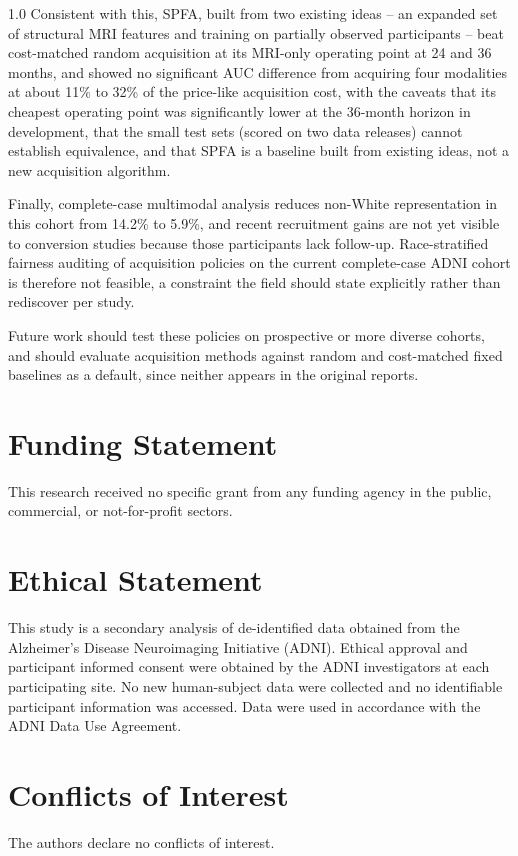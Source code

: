 \documentclass[12pt,twoside]{article}
\begin{document}
\begin{spacing}{1.0}
Consistent with this, SPFA, built from two existing ideas -- an expanded set
of structural MRI features and training on partially observed participants --
beat cost-matched random acquisition at its MRI-only operating point at 24 and
36 months, and showed no significant AUC difference from acquiring four
modalities at about 11\% to 32\% of the price-like acquisition cost, with the
caveats that its cheapest operating point was significantly lower at the
36-month horizon in development, that the small test sets (scored on two data
releases) cannot establish equivalence, and that SPFA is a baseline built from
existing ideas, not a new acquisition algorithm.

Finally, complete-case multimodal analysis reduces non-White representation
in this cohort from 14.2\% to 5.9\%, and recent recruitment gains are not
yet visible to conversion studies because those participants lack
follow-up. Race-stratified fairness auditing of acquisition policies on
the current complete-case ADNI cohort is therefore not feasible, a constraint the field should
state explicitly rather than rediscover per study.

Future work should test these policies on prospective or more diverse
cohorts, and should evaluate acquisition methods against random and
cost-matched fixed baselines as a default, since neither appears in the
original reports.

\section*{\fontsize{12}{12}\selectfont\textbf{Funding Statement}}
This research received no specific grant from any funding agency in the
public, commercial, or not-for-profit sectors.

\section*{\fontsize{12}{12}\selectfont\textbf{Ethical Statement}}
This study is a secondary analysis of de-identified data obtained from the
Alzheimer's Disease Neuroimaging Initiative (ADNI). Ethical approval and
participant informed consent were obtained by the ADNI investigators at
each participating site. No new human-subject data were collected and no
identifiable participant information was accessed. Data were used in
accordance with the ADNI Data Use Agreement.

\section*{\fontsize{12}{12}\selectfont\textbf{Conflicts of Interest}}
The authors declare no conflicts of interest.


\end{spacing}
\end{document}
